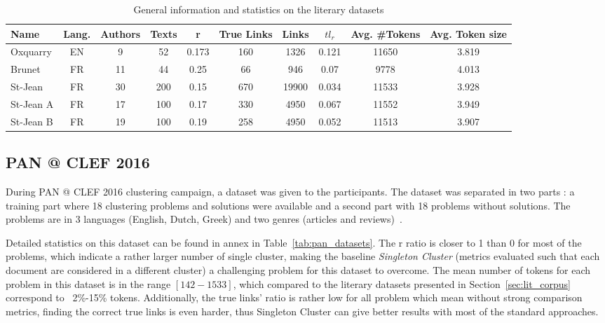 \begin{table*}
  \centering
  \caption{General information and statistics on the literary datasets}
  \label{tab:lit_datasets}
  \begin{tabular}{ l c c c c c c c c c }
    \toprule
    \textbf{Name} &
    \textbf{Lang.} &
    \textbf{Authors} &
    \textbf{Texts} &
    \textbf{r} &
    \textbf{True Links} &
    \textbf{Links} &
    \textbf{$tl_r$} &
    \textbf{Avg. \#Tokens} &
    \textbf{Avg. Token size} \\
    \midrule
    Oxquarry & EN & 9 & 52 & 0.173 & 160 & 1326 & 0.121 & 11650 & 3.819 \\
    Brunet & FR & 11 & 44 & 0.25 & 66 & 946 & 0.07 & 9778 & 4.013 \\
    St-Jean & FR & 30 & 200 & 0.15 & 670 & 19900 & 0.034 & 11533 & 3.928 \\
    St-Jean A & FR & 17 & 100 & 0.17 & 330 & 4950 & 0.067 & 11552 & 3.949 \\
    St-Jean B & FR & 19 & 100 & 0.19 & 258 & 4950 & 0.052 & 11513 & 3.907 \\
    \bottomrule
  \end{tabular}
\end{table*}


\subsection{PAN @ CLEF 2016}

During PAN @ CLEF 2016 clustering campaign, a dataset was given to the participants.
The dataset was separated in two parts : a training part where 18 clustering problems and solutions were available and a second part with 18 problems without solutions.
The problems are in 3 languages (English, Dutch, Greek) and two genres (articles and reviews)~\cite{pan16}.

Detailed statistics on this dataset can be found in annex in Table~\ref{tab:pan_datasets}.
The r ratio is closer to 1 than 0 for most of the problems, which indicate a rather larger number of single cluster, making the baseline \textit{Singleton Cluster} (metrics evaluated such that each document are considered in a different cluster) a challenging problem for this dataset to overcome.
The mean number of tokens for each problem in this dataset is in the range $[142-1533]$, which compared to the literary datasets presented in Section~\ref{sec:lit_corpus} correspond to ~2\%-15\% tokens.
Additionally, the true links' ratio is rather low for all problem which mean without strong comparison metrics, finding the correct true links is even harder, thus Singleton Cluster can give better results with most of the standard approaches.
